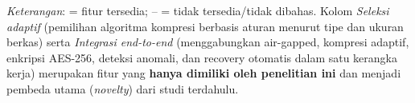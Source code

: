 \documentclass[10pt,a4paper]{article}
\begin{document}
\begin{table}[htbp]
\vspace{4pt}
\raggedright\footnotesize
\textit{Keterangan}: \checkmark{} = fitur tersedia; -- = tidak tersedia/tidak dibahas.
Kolom \textit{Seleksi adaptif} (pemilihan algoritma kompresi berbasis aturan menurut tipe
dan ukuran berkas) serta \textit{Integrasi end-to-end} (menggabungkan air-gapped, kompresi
adaptif, enkripsi AES-256, deteksi anomali, dan recovery otomatis dalam satu kerangka kerja)
merupakan fitur yang \textbf{hanya dimiliki oleh penelitian ini} dan menjadi pembeda utama
(\textit{novelty}) dari studi terdahulu.
\end{table}
\end{document}
